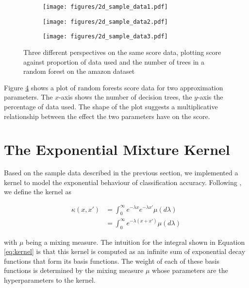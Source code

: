 \documentclass[a4paper,12pt,twoside,openright]{report}
\begin{document}
\begin{figure}
\centering
\begin{subfigure}{.33\textwidth}
  \centering
  \texttt{[image: figures/2d\_sample\_data1.pdf]}
  \caption{}
  \label{2d_1}
\end{subfigure}%
\begin{subfigure}{.33\textwidth}
  \centering
  \texttt{[image: figures/2d\_sample\_data2.pdf]}
  \caption{}
  \label{2d_2}
\end{subfigure}
\begin{subfigure}{.33\textwidth}
  \centering
  \texttt{[image: figures/2d\_sample\_data3.pdf]}
  \caption{}
  \label{2d_3}
\end{subfigure}
\caption{Three different perspectives on the same score data, plotting score against proportion of data used and the number of trees in a random forest on the amazon dataset}
\label{2d}
\end{figure}


Figure \ref{2d} shows a plot of random forests score data for two approximation parameters. The $x$-axis shows the number of decision trees, the $y$-axis the percentage of data used. The shape of the plot suggests a multiplicative relationship between the effect the two parameters have on the score.


\section{The Exponential Mixture Kernel}

Based on the sample data described in the previous section, we implemented a kernel to model the exponential behaviour of classification accuracy. Following \cite{2014arXiv1406.3896S}, we define the kernel as

\begin{align}
\kappa(x,x') &= \int_{0}^{\infty} e^{-\lambda x}e^{-\lambda x'}\mu(d\lambda)\\
&= \int_{0}^{\infty} e^{-\lambda(x+x')}\mu(d\lambda) \label{eq:kernel}
\end{align}

with $\mu$ being a mixing measure. The intuition for the integral shown in Equation \ref{eq:kernel} is that this kernel is computed as an infinite sum of exponential decay functions that form its basis functions. The weight of each of these basis functions is determined by the mixing measure $\mu$ whose parameters are the hyperparameters to the kernel.
\end{document}
